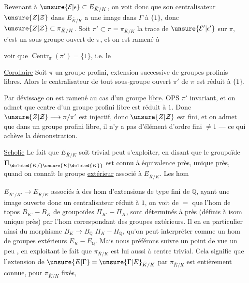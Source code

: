 Revenant à $\unsure{\mathcal E|\epsilon}\subset E_{\bar K/K}$, on voit donc que son centralisateur $\unsure{Z|\mathcal Z}$ dans $E_{\bar K/K}$ a une image dans $\Gamma$  à $\{1\}$, donc $\unsure{Z|\mathcal Z}\subset\pi_{\bar K/K}$. Soit $\pi'\subset\pi=\pi_{\bar K/K}$ la trace de $\unsure{\mathcal E'|\epsilon'}$ sur $\pi$, c'est un sous-groupe ouvert de $\pi$, et on est ramené à

voir que $\operatorname{Centr}_{\pi}(\pi')=\{1\}$, i.e. le

\uline{Corollaire} Soit $\pi$ un groupe profini, extension successive de groupes profinis libres. Alors le centralisateur  de tout sous-groupe ouvert $\pi'$ de $\pi$ est réduit à $\{1\}$.

Par dévissage on est ramené au cas d'un groupe  \uline{libre}.  OPS $\pi'$ invariant, et on admet que  centre d'un groupe profini libre est réduit à $1$.
Donc $\unsure{Z|\mathcal Z}\longrightarrow\pi/\pi'$ est injectif, donc $\unsure{Z|\mathcal Z}$ est fini, et on admet que dans un groupe profini libre, il n'y a pas d'élément d'ordre fini $\neq1$  --- ce qui achève la démonstration.

\uline{Scholie} Le fait que $E_{\bar K/K}$ soit   trivial peut s'exploiter, en disant que le groupoïde $\Pi_{\deleted{\bar K/}\unsure{K|\deleted{K}}}$  est connu à équivalence près,  unique près, quand on connaît le groupe \uline{extérieur} associé à $E_{\bar K/K}$. Les hom

$E_{\bar K'/K'}\longrightarrow E_{\bar K/K}$ associés à des hom  d'extensions de type fini de $\mathbb Q$, ayant une image ouverte donc un centralisateur réduit à $1$, on voit de $=$ que l'hom de topos $B_{K'}-B_K$  de groupoïdes $\Pi_{K'}-\Pi_K$, sont déterminés à  près (définis à isom unique près) par l'hom correspondant des groupes extérieurs. Il en  en particulier ainsi du morphisme  $B_K\longrightarrow B_{\mathbb Q}$  $\Pi_K-\Pi_{\mathbb Q}$, qu'on peut interpréter  comme un hom de groupes  extérieurs $E_K-E_{\mathbb Q}$. Mais nous préférons suivre un point de vue un peu , en exploitant le fait que $\pi_{\bar K/K}$ est lui aussi à centre trivial. Cela signifie que l'extension de $\unsure{E|\Gamma}=\unsure{\Gamma|E}_{\bar K/K}$ par $\pi_{\bar K/K}$ est entièrement connue,  pour $\pi_{\bar K/K}$  fixés,

